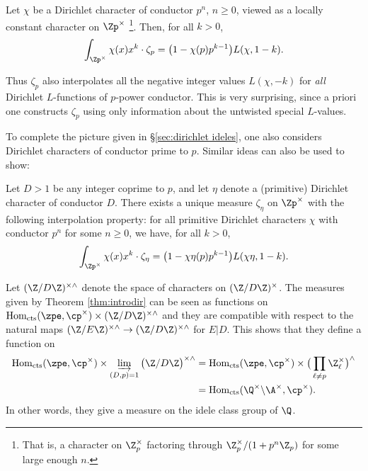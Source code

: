 \documentclass[a4paper,10pt, english, reqno]{smfart}
\newcommand{\Homc}{\mathrm{Hom}_{\mathrm{cts}}}
\numberwithin{equation}{section}
\begin{document}
\begin{theorem} \label{thm:introinterpdir}
	Let $\chi$ be a Dirichlet character of conductor $p^n$, $n\geq 0$, viewed as a locally constant character on $\Zp^\times$ \footnote{ That is, a character on $\Z_p^\times$ factoring through $\Z_p^\times / (1 + p^n \Z_p)$ for some large enough $n$.}. Then, for all $k > 0$,
	\[\int_{\Zp^\times} \chi(x) x^k \cdot \zeta_p = \big(1- \chi(p)p^{k-1}\big)L(\chi,1-k).\]
\end{theorem}


Thus $\zeta_p$ also interpolates all the negative integer values $L(\chi,-k)$ for \emph{all} Dirichlet $L$-functions of $p$-power conductor. This is very surprising, since a priori one constructs $\zeta_p$ using only information about the untwisted special $L$-values.


To complete the picture given in \S\ref{sec:dirichlet ideles}, one also considers Dirichlet characters of conductor prime to $p$. Similar ideas can also be used to show:

\begin{theorem} \label{thm:introdir}
	Let $D > 1$ be any integer coprime to $p$, and let $\eta$ denote a (primitive) Dirichlet character of conductor $D$. There exists a unique measure $\zeta_\eta$ on $\Zp^\times$ with the following interpolation property: for all primitive Dirichlet characters $\chi$ with conductor $p^n$ for some $n \geq 0$, we have, for all $k > 0$,
	\[\int_{\Zp^\times} \chi(x) x^k \cdot\zeta_{\eta} = \big(1 - \chi\eta(p)p^{k-1} \big) L(\chi\eta, 1-k). \]
\end{theorem}

\begin{remark} Let $(\Z/D\Z)^{\times\wedge}$ denote the space of characters on $(\Z/D\Z)^\times$. The measures given by Theorem \ref{thm:introdir} can be seen as functions on $\Homc(\zpe, \cp^\times) \times (\Z / D \Z)^{\times\wedge}$ and they are compatible with respect to the natural maps $(\Z / E \Z)^{\times\wedge} \to (\Z / D \Z)^{\times\wedge}$ for $E | D$. This shows that they define a function on
	\begin{align*}
		\Homc(\zpe, \cp^\times) \times \varinjlim_{(D, p) = 1} \big( \Z / D \Z\big)^{\times\wedge} &= \Homc(\zpe, \cp^\times) \times \big( \prod_{\ell \neq p} \Z_\ell^\times \big)^\wedge \\
		&= \Homc(\Q^\times \backslash \A^\times, \cp^\times).
	\end{align*}
	In other words, they give a measure on the idele class group of $\Q$.
\end{remark}
\end{document}
